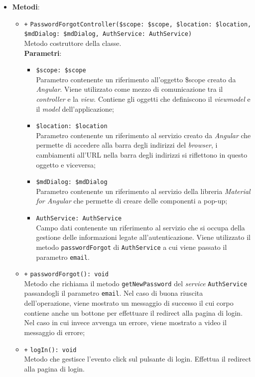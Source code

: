 \begin{itemize}
\begin{itemize}
	\end{itemize}
	\item \textbf{Metodi}:
	\begin{itemize}
		\item \texttt{+} \texttt{PasswordForgotController(\$scope: \$scope, \$location: \$location, \$mdDialog: \$mdDialog, AuthService: AuthService)} \\
		Metodo costruttore della classe. \\
		\textbf{Parametri}:
		\begin{itemize}
			\item \texttt{\$scope: \$scope} \\
			Parametro contenente un riferimento all'oggetto \$scope creato da \textit{Angular}. Viene utilizzato come mezzo di comunicazione tra il \textit{controller} e la \textit{view}. Contiene gli oggetti che definiscono il \textit{viewmodel} e il \textit{model} dell'applicazione;
			\item \texttt{\$location: \$location} \\
			Parametro contenente un riferimento al servizio creato da \textit{Angular} che permette di accedere alla barra degli indirizzi del \textit{browser}, i cambiamenti all'URL nella barra degli indirizzi si riflettono in questo oggetto e viceversa;
			\item \texttt{\$mdDialog: \$mdDialog} \\
			Parametro contenente un riferimento al servizio della libreria \textit{Material for Angular} che permette di creare delle componenti a pop-up;
			\item \texttt{AuthService: AuthService} \\
			Campo dati contenente un riferimento al servizio che si occupa della gestione delle informazioni legate all'autenticazione. Viene utilizzato il metodo \texttt{passwordForgot} di \texttt{AuthService} a cui viene passato il parametro \texttt{email}.
		\end{itemize}
		\item \texttt{+} \texttt{passwordForgot(): void} \\
		Metodo che richiama il metodo \texttt{getNewPassword} del \textit{service} \texttt{AuthService} passandogli il parametro \texttt{email}. Nel caso di buona riuscita dell'operazione, viene mostrato un messaggio di successo il cui corpo contiene anche un bottone per effettuare il redirect alla pagina di login. Nel caso in cui invece avvenga un errore, viene mostrato a video il messaggio di errore;
		\item \texttt{+} \texttt{logIn(): void} \\
		Metodo che gestisce l'evento click sul pulsante di login. Effettua il redirect alla pagina di login.
	\end{itemize}
\end{itemize}

